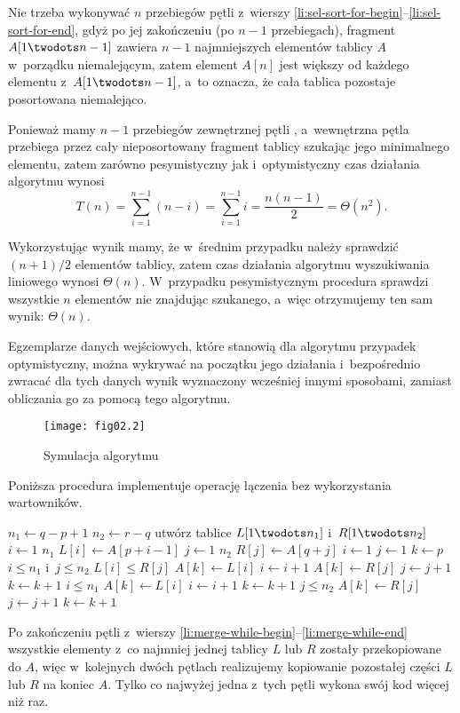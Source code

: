 Nie trzeba wykonywać $n$ przebiegów pętli  z~wierszy \ref{li:sel-sort-for-begin}\nobreakdash--\ref{li:sel-sort-for-end}, gdyż po jej zakończeniu (po $n-1$ przebiegach), fragment $A[1\twodots n-1]$ zawiera $n-1$ najmniejszych elementów tablicy $A$ w~porządku niemalejącym, zatem element $A[n]$ jest większy od każdego elementu z~$A[1\twodots n-1]$, a~to oznacza, że cała tablica pozostaje posortowana niemalejąco.

Ponieważ mamy $n-1$ przebiegów zewnętrznej pętli , a~wewnętrzna pętla  przebiega przez cały nieposortowany fragment tablicy szukając jego minimalnego elementu, zatem zarówno pesymistyczny jak i~optymistyczny czas działania algorytmu wynosi
\[
	T(n) = \sum_{i=1}^{n-1}(n-i) = \sum_{i=1}^{n-1}i = \frac{n(n-1)}{2} = \Theta(n^2).
\]

\exercise{} %
Wykorzystując wynik  mamy, że w~średnim przypadku należy sprawdzić $(n+1)/2$ elementów tablicy, zatem czas działania algorytmu wyszukiwania liniowego wynosi $\Theta(n)$. W~przypadku pesymistycznym procedura sprawdzi wszystkie $n$ elementów nie znajdując szukanego, a~więc otrzymujemy ten sam wynik: $\Theta(n)$.

\exercise{} %
Egzemplarze danych wejściowych, które stanowią dla algorytmu przypadek optymistyczny, można wykrywać na początku jego działania i~bezpośrednio zwracać dla tych danych wynik wyznaczony wcześniej innymi sposobami, zamiast obliczania go za pomocą tego algorytmu.


\exercise{} %
\begin{figure}[!h]
	\begin{center}
		\texttt{[image: fig02.2]}
	\end{center}
	\caption{Symulacja algorytmu }
\end{figure}

\exercise{} %
Poniższa procedura implementuje operację łączenia bez wykorzystania wartowników.
\begin{codebox}
\li	$n_1\gets q-p+1$
\li	$n_2\gets r-q$
\li	utwórz tablice $L[1\twodots n_1]$ i~$R[1\twodots n_2]$
\li	\For $i\gets1$ \To $n_1$
\li		\Do
			$L[i]\gets A[p+i-1]$
		\End
\li	\For $j\gets1$ \To $n_2$
\li		\Do
			$R[j]\gets A[q+j]$
		\End
\li	$i\gets1$
\li	$j\gets1$
\li	$k\gets p$
\li	\While $i\le n_1$ i~$j\le n_2$ \label{li:merge-while-begin}
\li		\Do
			\If $L[i]\le R[j]$
\li				\Then
					$A[k]\gets L[i]$
\li					$i\gets i+1$
\li				\Else
					$A[k]\gets R[j]$
\li					$j\gets j+1$
				\End
\li			$k\gets k+1$
		\End \label{li:merge-while-end}
\li	\While $i\le n_1$
\li		\Do
			$A[k]\gets L[i]$
\li			$i\gets i+1$
\li			$k\gets k+1$
		\End
\li	\While $j\le n_2$
\li		\Do
			$A[k]\gets R[j]$
\li			$j\gets j+1$
\li			$k\gets k+1$
		\End
\end{codebox}
Po zakończeniu pętli  z~wierszy \ref{li:merge-while-begin}\nobreakdash--\ref{li:merge-while-end} wszystkie elementy z~co najmniej jednej tablicy $L$ lub $R$ zostały przekopiowane do $A$, więc w~kolejnych dwóch pętlach  realizujemy kopiowanie pozostałej części $L$ lub $R$ na koniec $A$. Tylko co najwyżej jedna z~tych pętli wykona swój kod więcej niż raz.

